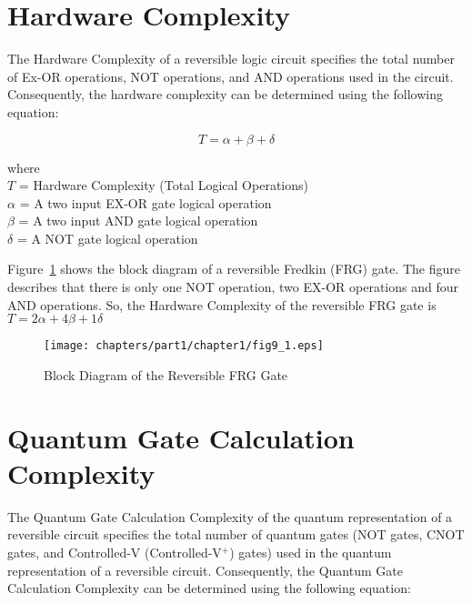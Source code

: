 
\section{Hardware Complexity}
The Hardware Complexity of a reversible logic circuit specifies the total number of Ex-OR operations, NOT operations, and AND operations used in the circuit. Consequently, the hardware complexity can be determined using the following equation:

\begin{equation}
T=\alpha+\beta+\delta
\end{equation}

\noindent where\\
$T$ = Hardware Complexity  (Total  Logical  Operations)\\ 
$\alpha$ = A two input EX-OR gate logical operation \\
$\beta$ = A two input AND gate logical operation \\
$\delta$ = A  NOT gate logical  operation  

\begin{example}\textnormal{
	Figure~\ref{fig:p1_c1_fig9_1} shows the block diagram of  a reversible Fredkin (FRG) gate. The figure describes that there is only one NOT operation, two EX-OR operations and four AND operations. So, the Hardware Complexity of the reversible FRG gate is $T= 2\alpha+4\beta+1\delta$}
\end{example}
\begin{figure}[H]
	\centering
	\texttt{[image: chapters/part1/chapter1/fig9\_1.eps]}
	\caption{Block Diagram of the Reversible FRG Gate}
	\label{fig:p1_c1_fig9_1}
\end{figure}

\section{Quantum Gate Calculation Complexity}
The Quantum Gate Calculation Complexity of the quantum  representation  of a reversible circuit specifies the total number of quantum gates (NOT gates, CNOT gates, and Controlled-V (Controlled-V$^+$) gates) used in the quantum representation of a reversible circuit. Consequently, the Quantum Gate Calculation Complexity can be determined using the following equation:



